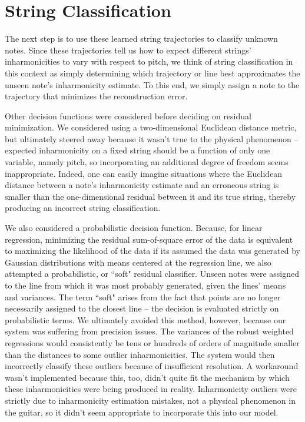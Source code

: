 \documentclass[12pt]{cmuthesis}
\begin{document}
\section{String Classification}
\label{sec:string-classification}
The next step is to use these learned string trajectories to classify unknown notes. Since these trajectories tell us how to expect different strings' inharmonicities to vary with respect to pitch, we think of string classification in this context as simply determining which trajectory or line best approximates the unseen note's inharmonicity estimate. To this end, we simply assign a note to the trajectory that minimizes the reconstruction error. 

Other decision functions were considered before deciding on residual minimization. We considered using a two-dimensional Euclidean distance metric, but ultimately steered away because it wasn't true to the physical phenomenon -- expected inharmonicity on a fixed string should be a function of only one variable, namely pitch, so incorporating an additional degree of freedom seems inappropriate. Indeed, one can easily imagine situations where the Euclidean distance between a note's inharmonicity estimate and an erroneous string is smaller than the one-dimensional residual between it and its true string, thereby producing an incorrect string classification. 

We also considered a probabilistic decision function. Because, for linear regression, minimizing the residual sum-of-square error of the data is equivalent to maximizing the likelihood of the data if its assumed the data was generated by Gaussian distributions with means centered at the regression line, we also attempted a probabilistic, or ``soft" residual classifier. Unseen notes were assigned to the line from which it was most probably generated, given the lines' means and variances. The term ``soft" arises from the fact that points are no longer necessarily assigned to the closest line -- the decision is evaluated strictly on probabilistic terms. We ultimately avoided this method, however, because our system was suffering from precision issues. The variances of the robust weighted regressions would consistently be tens or hundreds of orders of magnitude smaller than the distances to some outlier inharmonicities. The system would then incorrectly classify these outliers because of insufficient resolution. A workaround wasn't implemented because this, too, didn't quite fit the mechanism by which these inharmonicities were being produced in reality. Inharmonicity outliers were strictly due to inharmonicity estimation mistakes, not a physical phenomenon in the guitar, so it didn't seem appropriate to incorporate this into our model.
\end{document}
